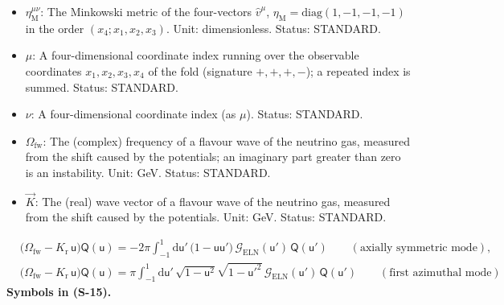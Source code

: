 \documentclass[
  10pt,
]{article}
\begin{document}
\begin{itemize}
  STANDARD.
\item
  \(\eta_{\mathrm{M}}^{\mu\nu}\): The Minkowski metric of the
  four-vectors \(\hat v^\mu\),
  \(\eta_{\mathrm{M}} = \mathrm{diag}(1, -1, -1, -1)\) in the order
  \((x_4; x_1, x_2, x_3)\). Unit: dimensionless. Status: STANDARD.
\item
  \(\mu\): A four-dimensional coordinate index running over the
  observable coordinates \(x_1, x_2, x_3, x_4\) of the fold (signature
  \(+,+,+,-\)); a repeated index is summed. Status: STANDARD.
\item
  \(\nu\): A four-dimensional coordinate index (as \(\mu\)). Status:
  STANDARD.
\item
  \(\Omega_{\mathrm{fw}}\): The (complex) frequency of a flavour wave of
  the neutrino gas, measured from the shift caused by the potentials; an
  imaginary part greater than zero is an instability. Unit: GeV. Status:
  STANDARD.
\item
  \(\vec K\): The (real) wave vector of a flavour wave of the neutrino
  gas, measured from the shift caused by the potentials. Unit: GeV.
  Status: STANDARD.
\end{itemize}

\[
\begin{aligned}
&\Big(\Omega_{\mathrm{fw}} - K_{\mathrm{r}}\,\mathsf{u}\Big)\mathsf{Q}(\mathsf{u}) = -2\pi\int_{-1}^{1}\mathrm{d}\mathsf{u}'\,\big(1 - \mathsf{u}\mathsf{u}'\big)\,\mathcal{G}_{\mathrm{ELN}}(\mathsf{u}')\,\mathsf{Q}(\mathsf{u}')\qquad(\text{axially symmetric mode}),\\
&\Big(\Omega_{\mathrm{fw}} - K_{\mathrm{r}}\,\mathsf{u}\Big)\mathsf{Q}(\mathsf{u}) = \pi\int_{-1}^{1}\mathrm{d}\mathsf{u}'\,\sqrt{1 - \mathsf{u}^2}\sqrt{1 - \mathsf{u}'^2}\,\mathcal{G}_{\mathrm{ELN}}(\mathsf{u}')\,\mathsf{Q}(\mathsf{u}')\qquad(\text{first azimuthal mode})
\end{aligned} \tag{S-15}
\] \textbf{Symbols in (S-15).}
\end{document}
